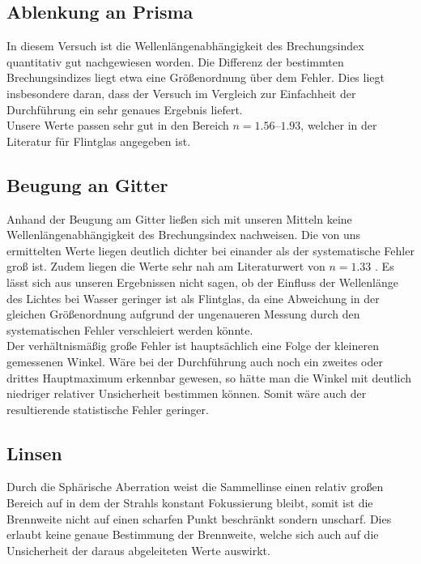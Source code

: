 \subsection{Ablenkung an Prisma}
In diesem Versuch ist die Wellenlängenabhängigkeit des Brechungsindex quantitativ gut nachgewiesen worden. Die Differenz der bestimmten Brechungsindizes liegt etwa eine Größenordnung über dem Fehler. Dies liegt insbesondere daran, dass der Versuch im Vergleich zur Einfachheit der Durchführung ein sehr genaues Ergebnis liefert. \\
Unsere Werte passen sehr gut in den Bereich $ n = \numrange{1.56}{1,93} $, welcher in der Literatur \cite{wiki:brechindex} für Flintglas angegeben ist.

\subsection{Beugung an Gitter}
Anhand der Beugung am Gitter ließen sich mit unseren Mitteln keine Wellenlängenabhängigkeit des Brechungsindex nachweisen. Die von uns ermittelten Werte liegen deutlich dichter bei einander als der systematische Fehler groß ist. Zudem liegen die Werte sehr nah am Literaturwert von $ n = \num{1.33} $ \cite{wiki:brechindex}. Es lässt sich aus unseren Ergebnissen nicht sagen, ob der Einfluss der Wellenlänge des Lichtes bei Wasser geringer ist als Flintglas, da eine Abweichung in der gleichen Größenordnung aufgrund der ungenaueren Messung durch den systematischen Fehler verschleiert werden könnte. \\
Der verhältnismäßig große Fehler ist hauptsächlich eine Folge der kleineren gemessenen Winkel. Wäre bei der Durchführung auch noch ein zweites oder drittes Hauptmaximum erkennbar gewesen, so hätte man die Winkel mit deutlich niedriger relativer Unsicherheit bestimmen können. Somit wäre auch der resultierende statistische Fehler geringer.

\subsection{Linsen}
Durch die Sphärische Aberration weist die Sammellinse einen relativ großen Bereich auf in dem der  Strahls konstant Fokussierung bleibt, somit ist die Brennweite nicht auf einen scharfen Punkt beschränkt sondern unscharf. Dies erlaubt keine genaue Bestimmung der Brennweite, welche sich auch auf die Unsicherheit der daraus abgeleiteten Werte auswirkt.
